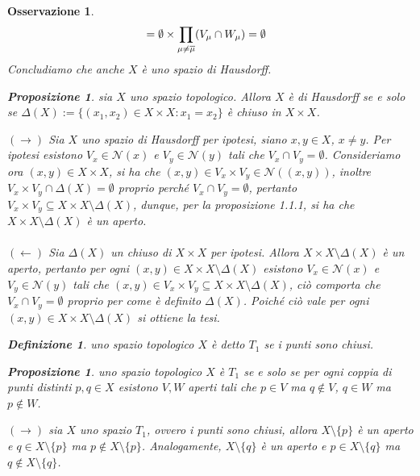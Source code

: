 \documentclass[oneside, 11pt]{amsbook}
\makeatletter
\newcommand{\0}{{(0)}}
\newcommand{\3}{{(3)}}
\theoremstyle{colonplain}
\newtheorem{prop}[thm]{Proposizione}
\theoremstyle{colondefinition}
\newtheorem{defn}[thm]{Definizione}
\theoremstyle{colonremark}
\newtheorem{rmk}[thm]{Osservazione}
\numberwithin{equation}{chapter}
\renewcommand{\proofname}{Dimostrazione}
\renewenvironment{proof}[1][\proofname]{\par
  \pushQED{\end{proof}}%
  \normalfont \topsep6\p@\@plus6\p@\relax
  \trivlist
  \item[\hskip\labelsep\bfseries #1:]\ignorespaces
}{%
  \popQED\endtrivlist\@endpefalse
}
\makeatother
\begin{document}
\begin{rmk}
\begin{proof}
\begin{align}
    &= \emptyset \times \prod_{\mu \neq \overline{\mu}} (V_\mu \cap W_\mu) = \emptyset \notag
\end{align}
Concludiamo che anche $X$ è uno spazio di Hausdorff.
\end{proof}
\begin{prop}
sia $X$ uno spazio topologico. Allora $X$ è di Hausdorff se e solo se $\Delta(X) := \{ (x_1, x_2) \in X \times X : x_1 = x_2 \}$ è chiuso in $X \times X$.
\end{prop}
\begin{proof}
$(\rightarrow)$ Sia $X$ uno spazio di Hausdorff per ipotesi, siano $x, y \in X$, $x \neq y$. Per ipotesi esistono $V_x \in \mathcal{N}(x)$ e $V_y \in \mathcal{N}(y)$ tali che $V_x \cap V_y = \emptyset$. Consideriamo ora $(x, y) \in X \times X$, si ha che $(x, y) \in V_x \times V_y \in \mathcal{N}((x, y))$, inoltre $V_x \times V_y \cap \Delta (X) = \emptyset$ proprio perché $V_x \cap V_y = \emptyset$, pertanto $V_x \times V_y \subseteq X \times X \setminus \Delta (X)$, dunque, per la \textit{proposizione 1.1.1}, si ha che $X \times X \setminus \Delta (X)$ è un aperto. \\ \\
$(\leftarrow)$ Sia $\Delta (X)$ un chiuso di $X \times X$ per ipotesi. Allora $X \times X \setminus \Delta (X)$ è un aperto, pertanto per ogni $(x, y) \in X \times X \setminus \Delta (X)$ esistono $V_x \in \mathcal{N}(x)$ e $V_y \in \mathcal{N}(y)$ tali che $(x, y) \in V_x \times V_y \subseteq X \times X \setminus \Delta (X)$, ciò comporta che $V_x \cap V_y = \emptyset$ proprio per come è definito $\Delta (X)$. Poiché ciò vale per ogni $(x, y) \in X \times X \setminus \Delta (X)$ si ottiene la tesi.
\end{proof}
\begin{defn}
uno spazio topologico $X$ è detto $T_1$ se i punti sono chiusi.
\end{defn}
\begin{prop}
uno spazio topologico $X$ è $T_1$ se e solo se per ogni coppia di punti distinti $p, q \in X$ esistono $V, W$ aperti tali che $p \in V$ ma $q \not\in V$, $q \in W$ ma $p \not\in W$.
\end{prop}
\begin{proof}
$(\rightarrow)$ sia $X$ uno spazio $T_1$, ovvero i punti sono chiusi, allora $X \setminus \{ p \}$ è un aperto e $q \in X \setminus \{ p \}$ ma $p \not\in X \setminus \{ p \}$. Analogamente, $X \setminus \{ q \}$ è un aperto e $p \in X \setminus \{ q \}$ ma $q \not\in X \setminus \{ q \}$. \\ \\

\end{proof}
\end{rmk}
\end{document}
